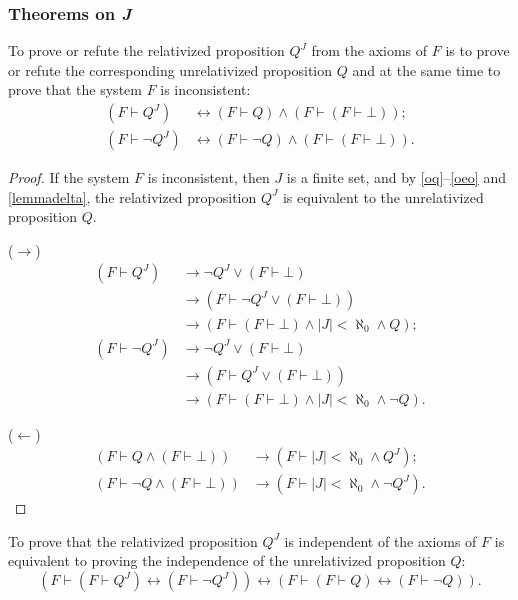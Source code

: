 \documentclass[letterpaper]{article}
\newcommand{\Lemma}{{\large\FlatSteel}}
\newcommand{\Construction}{{\large\dsmathematical}}
\begin{document}
\subsubsection{Theorems on \textit{J}}
\begin{lemma}\label{prqj}
	To prove or refute the relativized proposition $Q^J$ from the axioms of $F$ is to prove or refute the corresponding unrelativized proposition $Q$ and at the same time to prove that the system $F$ is inconsistent:
	\begin{align}
	(F\vdash Q^J)&\longleftrightarrow(F\vdash Q)\land(F\vdash(F\vdash\bot));\\
	(F\vdash\lnot Q^J)&\longleftrightarrow(F\vdash\lnot Q)\land(F\vdash(F\vdash\bot)).
	\end{align}
\end{lemma}
\begin{proof}
	If the system $F$ is inconsistent, then $J$ is a finite set, and by \Construction\Construction \ref{oq}--\ref{oeo} and \Lemma \ref{lemmadelta}, the relativized proposition $Q^J$ is equivalent to the unrelativized proposition $Q$.
	
	($\longrightarrow$)
	\begin{align}
	(F\vdash Q^J)&\longrightarrow\lnot Q^J\lor(F\vdash\bot)\\
	&\longrightarrow(F\vdash\lnot Q^J\lor(F\vdash\bot))\\
	&\longrightarrow(F\vdash(F\vdash\bot)\land |J|<\aleph_0\land Q);\\
	(F\vdash\lnot Q^J)&\longrightarrow\lnot Q^J\lor(F\vdash\bot)\\
	&\longrightarrow(F\vdash Q^J\lor(F\vdash\bot))\\
	&\longrightarrow(F\vdash(F\vdash\bot)\land |J|<\aleph_0\land\lnot Q).
	\end{align}
	
	($\longleftarrow$)
	\begin{align}
	(F\vdash Q\land(F\vdash\bot))&\longrightarrow (F\vdash |J|<\aleph_0\land Q^J);\\
	(F\vdash\lnot Q\land(F\vdash\bot))&\longrightarrow (F\vdash |J|<\aleph_0\land\lnot Q^J).
	\end{align}
\end{proof}
\begin{theorem}\label{jind}
	To prove that the relativized proposition $Q^J$ is independent of the axioms of $F$ is equivalent to proving the independence of the unrelativized proposition $Q$:
		\begin{equation}
		(F\vdash(F\vdash Q^J)\longleftrightarrow(F\vdash\lnot Q^J))
		\longleftrightarrow
		(F\vdash(F\vdash Q)\longleftrightarrow(F\vdash\lnot Q)).
		\end{equation}
\end{theorem}
\end{document}
